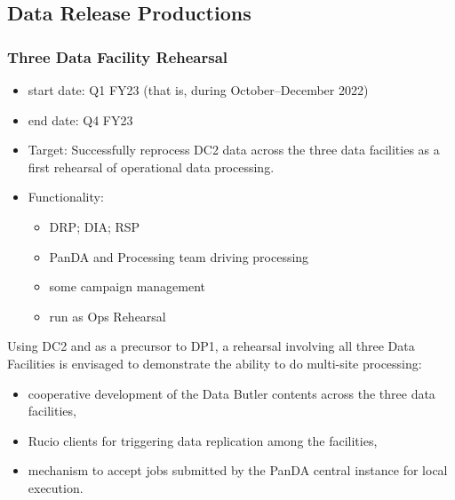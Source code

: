 

\subsection{Data \gls{Release} Productions}

\subsubsection{Three Data Facility Rehearsal}

\begin{itemize}

\item start date: Q1 \gls{FY23} (that is, during October--December 2022)

\item end date: Q4 \gls{FY23}

\item Target: Successfully reprocess \gls{DC2} data across the three data facilities as a first rehearsal of operational data processing.

\item Functionality:

  \begin{itemize}
    
  \item \gls{DRP}; \gls{DIA}; \gls{RSP}

  \item \gls{PanDA} and Processing team driving processing

  \item some campaign management

  \item run as Ops Rehearsal

  \end{itemize}
  
\end{itemize}

Using DC2 and as a precursor to DP1, a rehearsal involving all three Data Facilities is envisaged to demonstrate the ability to do multi-site processing:

\begin{itemize}
  
\item cooperative development of the Data Butler contents across the three data facilities,
  
\item Rucio clients for triggering data replication among the facilities,
  
\item mechanism to accept jobs submitted by the PanDA central instance for local execution.
  
\end{itemize}


